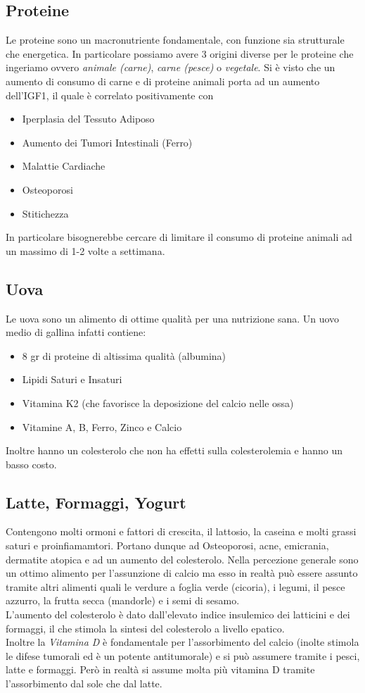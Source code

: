 \documentclass[../uefaC.tex]{subfiles}
\begin{document}
\subsection{Proteine}
Le proteine sono un macronutriente fondamentale, con funzione sia strutturale che energetica. In particolare possiamo avere 3 origini diverse per le proteine che ingeriamo ovvero \emph{animale (carne)}, \emph{carne (pesce)} o \emph{vegetale}. Si è visto che un aumento di consumo di carne e di proteine animali porta ad un aumento dell'IGF1, il quale è correlato positivamente con 
\begin{itemize}
    \item Iperplasia del Tessuto Adiposo
    \item Aumento dei Tumori Intestinali (Ferro)
    \item Malattie Cardiache
    \item Osteoporosi
    \item Stitichezza
\end{itemize}
In particolare bisognerebbe cercare di limitare il consumo di proteine animali ad un massimo di 1-2 volte a settimana.

\subsection{Uova}
Le uova sono un alimento di ottime qualità per una nutrizione sana. Un uovo medio di gallina infatti contiene:
\begin{itemize}
    \item 8 gr di proteine di altissima qualità (albumina)
    \item Lipidi Saturi e Insaturi 
    \item Vitamina K2 (che favorisce la deposizione del calcio nelle ossa)
    \item Vitamine A, B, Ferro, Zinco e Calcio
\end{itemize}
Inoltre hanno un colesterolo che non ha effetti sulla colesterolemia e hanno un basso costo.

\subsection{Latte, Formaggi, Yogurt}
Contengono molti ormoni e fattori di crescita, il lattosio, la caseina e molti grassi saturi e proinfiamamtori. Portano dunque ad Osteoporosi, acne, emicrania, dermatite atopica e ad un aumento del colesterolo. Nella percezione generale sono un ottimo alimento per l'assunzione di calcio ma esso in realtà può essere assunto tramite altri alimenti quali le verdure a foglia verde (cicoria), i legumi, il pesce azzurro, la frutta secca (mandorle) e i semi di sesamo. \hfill \\
L'aumento del colesterolo è dato dall'elevato indice insulemico dei latticini e dei formaggi, il che stimola la sintesi del colesterolo a livello epatico. \hfill \\
Inoltre la \emph{Vitamina D} è fondamentale per l'assorbimento del calcio (inolte stimola le difese tumorali ed è un potente antitumorale) e si può assumere tramite i pesci, latte e formaggi. Però in realtà si assume molta più vitamina D tramite l'assorbimento dal sole che dal latte.
\end{document}
